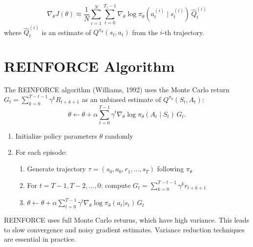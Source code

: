 \begin{keyformulas}[title=\textbf{Policy Gradient Estimator}]
\[
    \nabla_\theta J(\theta) \approx \frac{1}{N} \sum_{i=1}^{N}
    \sum_{t=0}^{T_i-1} \nabla_\theta \log \pi_\theta(a_t^{(i)} \mid s_t^{(i)})
    \, \hat{Q}_t^{(i)}
\]
where $\hat{Q}_t^{(i)}$ is an estimate of $Q^{\pi_\theta}(s_t, a_t)$
from the $i$-th trajectory.
\end{keyformulas}

\section{REINFORCE Algorithm}
\label{sec:reinforce}

\begin{definition}[REINFORCE]
The REINFORCE algorithm (Williams, 1992) uses the Monte Carlo return
$G_t = \sum_{k=0}^{T-t-1} \gamma^k R_{t+k+1}$ as an unbiased estimate
of $Q^{\pi_\theta}(S_t, A_t)$:
\[
    \theta \leftarrow \theta + \alpha \sum_{t=0}^{T-1}
    \gamma^t \nabla_\theta \log \pi_\theta(A_t \mid S_t) \, G_t.
\]
\end{definition}

\begin{algorithme}[title=\textbf{REINFORCE}]
\begin{enumerate}
    \item Initialize policy parameters $\theta$ randomly
    \item For each episode:
    \begin{enumerate}
        \item Generate trajectory $\tau = (s_0, a_0, r_1, \ldots, s_T)$
              following $\pi_\theta$
        \item For $t = T-1, T-2, \ldots, 0$: compute $G_t = \sum_{k=0}^{T-t-1} \gamma^k r_{t+k+1}$
        \item $\theta \leftarrow \theta + \alpha \sum_{t=0}^{T-1}
              \gamma^t \nabla_\theta \log \pi_\theta(a_t | s_t) \, G_t$
    \end{enumerate}
\end{enumerate}
\end{algorithme}

\begin{attention}[title=\textbf{High Variance of REINFORCE}]
REINFORCE uses full Monte Carlo returns, which have high variance.
This leads to slow convergence and noisy gradient estimates. Variance
reduction techniques are essential in practice.
\end{attention}

